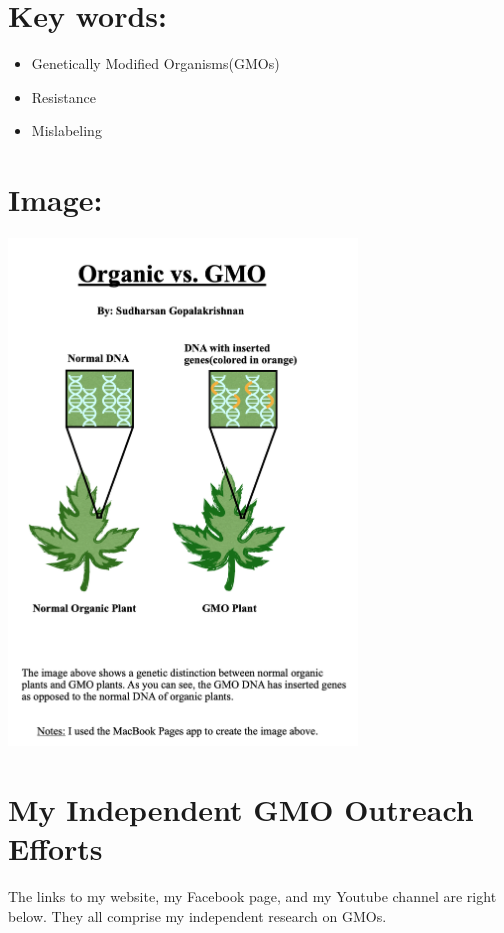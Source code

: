 \documentclass[11pt]{article}
\begin{document}
    \section{Key words:}
    \begin{itemize}
        \item Genetically Modified Organisms(GMOs)
        \item Resistance
        \item Mislabeling
    \end{itemize}

    \newpage
    \section{Image:}
    \includegraphics[width=350]{Sudharsan Gopalakrishnan Image.jpg}

    \section{My Independent GMO Outreach Efforts}
    The links to my website, my Facebook page, and my Youtube channel are right below.
    They all comprise my independent research on GMOs.
\end{document}
